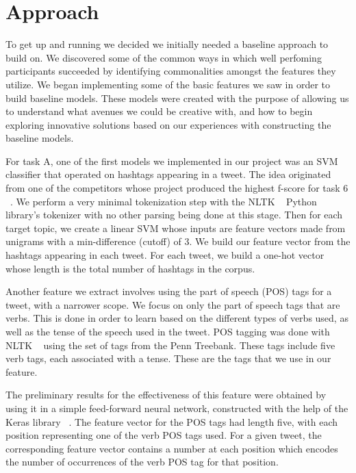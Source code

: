 \documentclass[11pt,letterpaper]{article}
\begin{document}
\section{Approach}

To get up and running we decided we initially needed a baseline approach to build on. We discovered some of the common ways in which well perfoming participants succeeded by identifying commonalities amongst the features they utilize. We began implementing some of the basic features we saw in order to build baseline models. These models were created with the purpose of allowing us to understand what avenues we could be creative with, and how to begin exploring innovative solutions based on our experiences with constructing the baseline models.

For task A, one of the first models we implemented in our project was an SVM classifier that operated on hashtags appearing in a tweet. The idea originated from one of the competitors whose project produced the highest f-score for task 6 ~\cite{MITRE}. We perform a very minimal tokenization step with the NLTK ~\cite{Loper} Python library’s tokenizer with no other parsing being done at this stage. Then for each target topic, we create a linear SVM whose inputs are feature vectors made from unigrams with a min-difference (cutoff) of 3. We build our feature vector from the hashtags appearing in each tweet. For each tweet, we build a one-hot vector whose length is the total number of hashtags in the corpus.

Another feature we extract involves using the part of speech (POS) tags for a tweet, with a narrower scope. We focus on only the part of speech tags that are verbs. This is done in order to learn based on the different types of verbs used, as well as the tense of the speech used in the tweet. POS tagging was done with NLTK ~\cite{Loper} using the set of tags from the Penn Treebank. These tags include five verb tags, each associated with a tense. These are the tags that we use in our feature.

The preliminary results for the effectiveness of this feature were obtained by using it in a simple feed-forward neural network, constructed with the help of the Keras library ~\cite{chollet2015keras}. The feature vector for the POS tags had length five, with each position representing one of the verb POS tags used. For a given tweet, the corresponding feature vector contains a number at each position which encodes the number of occurrences of the verb POS tag for that position.
\end{document}

